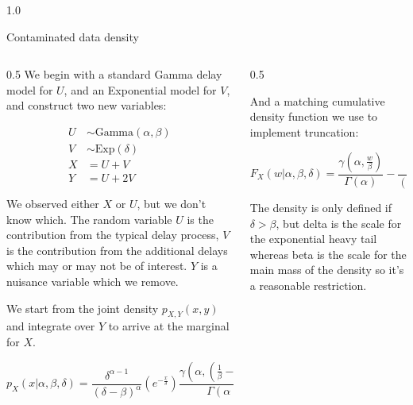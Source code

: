 \documentclass[final]{beamer}
\newlength{\onecolwid}
\begin{document}
\begin{frame}[t]
\begin{columns}[t]
\begin{column}{1.0\onecolwid}
\begin{block}{Contaminated data density}

\begin{columns}
\begin{column}{0.5\onecolwid}
We begin with a standard Gamma delay model for $U$, and an Exponential model for $V$, and construct two new variables:

\begin{align*}
U &\sim \text{Gamma}(\alpha, \beta) \\
V &\sim \text{Exp}(\delta) \\
X &= U + V  \\
Y &= U + 2V
\end{align*}

We observed either $X$ or $U$, but we don't know which.  The random variable $U$ is the contribution from the typical delay process, $V$ is the contribution from the additional delays which may or may not be of interest.  $Y$ is a nuisance variable which we remove.

\vspace{0.2in}
We start from the joint density $p_{X,Y}(x,y)$ and integrate over $Y$ to arrive at the marginal for $X$.      
     
\begin{equation*}
p_X(x|\alpha, \beta, \delta)  = \frac{\delta^{\alpha-1}}{(\delta-\beta)^\alpha} \left(e^{-\frac{x}{\delta}}\right) \frac{\gamma\left(\alpha, \left(\frac{1}{\beta}-\frac{1}{\delta}\right)x\right)}{\Gamma(\alpha)}
\end{equation*}


\end{column}

\begin{column}{0.5\onecolwid}

And a matching cumulative density function we use to implement truncation:

\begin{equation*}
F_X(w|\alpha, \beta, \delta) = \frac{\gamma\left(\alpha, \frac{w}{\beta}\right)}{\Gamma(\alpha)} - \frac{\delta^\alpha e^{\frac{-w}{\delta}}}{(\delta-\beta)^\alpha} \frac{\gamma\left(\alpha,\left(\frac{1}{\beta}-\frac{1}{\delta}\right)w\right)}{\Gamma(\alpha)}
\end{equation*}

The density is only defined if $\delta > \beta$, but delta is the scale for the exponential heavy tail whereas beta is the scale for the main mass of the density so it's a reasonable restriction.


\end{column}
\end{columns}
\end{block}
\end{column}
\end{columns}
\end{frame}
\end{document}
